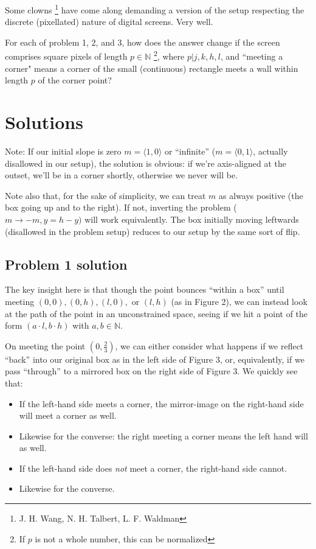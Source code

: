 \documentclass[11pt, oneside]{article} 	%
\begin{document}
Some clowns \footnote {J. H. Wang, N. H. Talbert, L. F. Waldman} have come along demanding a version of the setup respecting the discrete (pixellated) nature of digital screens.  Very well.

For each of problem 1, 2, and 3, how does the answer change if the screen comprises square pixels of length $p \in \mathbb{N}$ \footnote{If $p$ is not a whole number, this can be normalized}, where $p | j, k, h, l$, and ``meeting a corner" means a corner of the small (continuous) rectangle meets a wall within length $p$ of the corner point?


\section{Solutions}

Note: If our initial slope is zero $m = \langle 1, 0 \rangle$ or ``infinite'' ($m = \langle 0, 1 \rangle$, actually disallowed in our setup), the solution is obvious: if we're axis-aligned at the outset, we'll be in a corner shortly, otherwise we never will be.

Note also that, for the sake of simplicity, we can treat $m$ as always positive (the box going up and to the right). If not, inverting the problem ($m \rightarrow -m, y = h - y)$ will work equivalently. The box initially moving leftwards (disallowed in the problem setup) reduces to our setup by the same sort of flip.

\subsection{Problem 1 solution}

The key insight here is that though the point bounces ``within a box'' until meeting $(0,0), (0, h), (l, 0), $ or $(l, h)$ (as in Figure 2), we can instead look at the path of the point in an unconstrained space, seeing if we hit a point of the form $(a \cdot l, b \cdot h)$ with $a,b \in \mathbb{N}$.

On meeting the point $(0, \frac{2}{3})$, we can either consider what happens if we reflect ``back'' into our original box as in the left side of Figure 3, or, equivalently, if we pass ``through'' to a mirrored box on the right side of Figure 3. We quickly see that:

\begin{itemize} 
\item If the left-hand side meets a corner, the mirror-image on the right-hand side will meet a corner as well.
\item Likewise for the converse: the right meeting a corner means the left hand will as well.
\item If the left-hand side does \emph{not} meet a corner, the right-hand side cannot.
\item Likewise for the converse.
\end{itemize}
\end{document}
